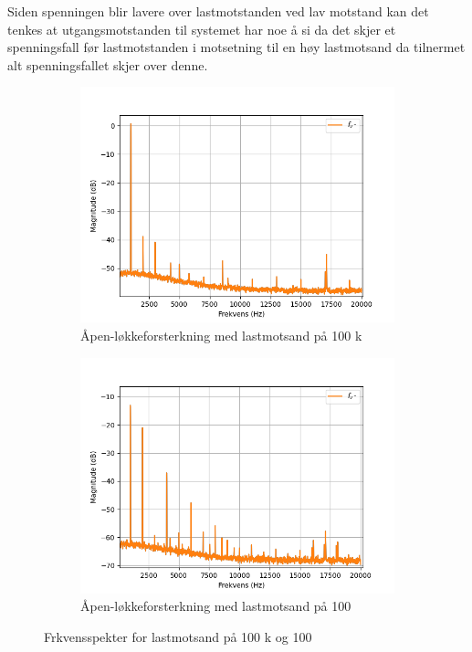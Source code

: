     Siden spenningen blir lavere over lastmotstanden  ved lav motstand kan det tenkes at utgangsmotstanden  til systemet har noe å si da det skjer et spenningsfall før lastmotstanden i motsetning til en høy lastmotsand da tilnermet alt spenningsfallet skjer over denne.

    \begin{figure}[!hbt]
        \centering
        \begin{subfigure}{.5\textwidth}
            \centering
            \includegraphics[width=1\linewidth]{./Images/03Research/spektrum100k.png}
            \caption{Åpen-løkkeforsterkning med lastmotsand på 100 k\text{$\Omega$}}
            \label{fig:100kspek}
        \end{subfigure}%
        \begin{subfigure}{.5\textwidth}
            \centering
            \includegraphics[width=1\linewidth]{./Images/03Research/spektrum100.png}
            \caption{Åpen-løkkeforsterkning med lastmotsand på 100 \text{$\Omega$}}
            \label{fig:100spek}
        \end{subfigure}
        \caption{Frkvensspekter for lastmotsand på 100 k\text{$\Omega$} og 100 \text{$\Omega$}}
        \label{fig:Frkvensspekter}
    \end{figure}

